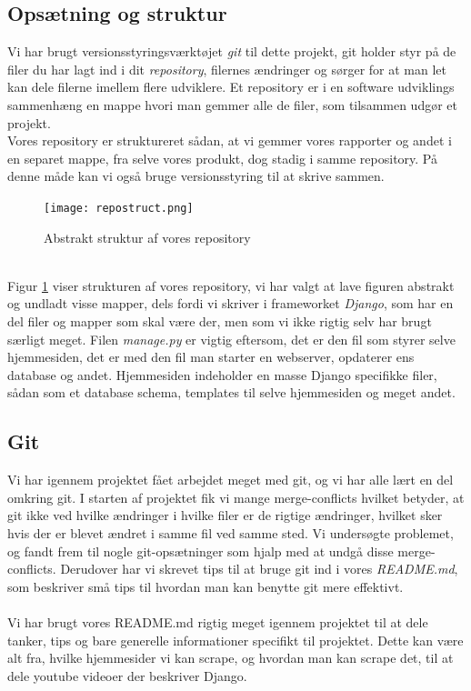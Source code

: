 \documentclass[12pt]{article}
\begin{document}
\subsection{Opsætning og struktur}
Vi har brugt versionsstyringsværktøjet \textit{git} til dette projekt, git holder styr på de filer du har lagt ind i dit \textit{repository}, filernes ændringer og sørger for at man let kan dele filerne imellem flere udviklere. Et repository er i en software udviklings sammenhæng en mappe hvori man gemmer alle de filer, som tilsammen udgør et projekt. \\
Vores repository er struktureret sådan, at vi gemmer vores rapporter og andet i en separet mappe, fra selve vores produkt, dog stadig i samme repository. På denne måde kan vi også bruge versionsstyring til at skrive sammen.

\begin{figure}[H]
	\centering
	\texttt{[image: repostruct.png]}
	 \caption{Abstrakt struktur af vores repository}
	 \label{fig:repostruct}
\end{figure}
~\\
Figur \ref{fig:repostruct} viser strukturen af vores repository, vi har valgt at lave figuren abstrakt og undladt visse mapper, dels fordi vi skriver i frameworket \textit{Django}, som har en del filer og mapper som skal være der, men som vi ikke rigtig selv har brugt særligt meget. Filen \textit{manage.py} er vigtig eftersom, det er den fil som styrer selve hjemmesiden, det er med den fil man starter en webserver, opdaterer ens database og andet. Hjemmesiden indeholder en masse Django specifikke filer, sådan som et database schema, templates til selve hjemmesiden og meget andet.

\subsection{Git}
Vi har igennem projektet fået arbejdet meget med git, og vi har alle lært en del omkring git. I starten af projektet fik vi mange merge-conflicts hvilket betyder, at git ikke ved hvilke ændringer i hvilke filer er de rigtige ændringer, hvilket sker hvis der er blevet ændret i samme fil ved samme sted. Vi undersøgte problemet, og fandt frem til nogle git-opsætninger som hjalp med at undgå disse merge-conflicts. Derudover har vi skrevet tips til at bruge git ind i vores \textit{README.md}, som beskriver små tips til hvordan man kan benytte git mere effektivt. \\ \\
Vi har brugt vores README.md rigtig meget igennem projektet til at dele tanker, tips og bare generelle informationer specifikt til projektet. Dette kan være alt fra, hvilke hjemmesider vi kan scrape, og hvordan man kan scrape det, til at dele youtube videoer der beskriver Django.
\end{document}
